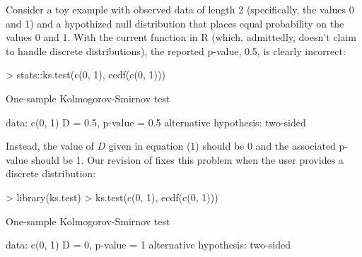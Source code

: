 Consider a toy example with observed data of length 2 (specifically, the
values 0 and 1) and a hypothized null distribution that places equal
probability on the values 0 and 1.  With the current  function
in R (which, admittedly, doesn't claim to handle discrete distributions),
the reported p-value, 0.5, is clearly incorrect:
\begin{Schunk}
\begin{Sinput}
> stats::ks.test(c(0, 1), ecdf(c(0, 1)))
\end{Sinput}
\begin{Soutput}
	One-sample Kolmogorov-Smirnov test

data:  c(0, 1) 
D = 0.5, p-value = 0.5
alternative hypothesis: two-sided 
\end{Soutput}
\end{Schunk}
Instead, the value of $D$ given in equation (1)
should be 0 and the associated p-value should be 1.  Our revision of 
fixes this problem when the user provides a discrete distribution:
\begin{Schunk} 
\begin{Sinput}
> library(ks.test)
> ks.test(c(0, 1), ecdf(c(0, 1)))
\end{Sinput}
\begin{Soutput}
	One-sample Kolmogorov-Smirnov test

data:  c(0, 1) 
D = 0, p-value = 1
alternative hypothesis: two-sided 
\end{Soutput}
\end{Schunk}

